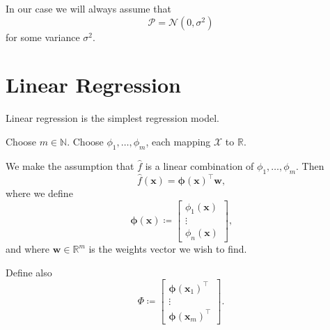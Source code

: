 \documentclass[11pt,twoside]{report}
\newcommand\bw{\mathbf{w}}
\newcommand\bx{\mathbf{x}}
\newcommand\bphi{\bm{\phi}}
\newcommand\bbN{\mathbb{N}}
\newcommand\bbR{\mathbb{R}}
\newcommand\cN{\mathcal{N}}
\newcommand\cP{\mathcal{P}}
\newcommand\cX{\mathcal{X}}
\begin{document}
In our case we will always assume that \[
    \cP = \cN(0, \sigma^2)
\] for some variance $\sigma^2$.

\section{Linear Regression}

Linear regression is the simplest regression model.

Choose $m \in \bbN$. Choose $\phi_1, \dots, \phi_m$, each mapping $\cX$ to $\bbR$.

We make the assumption that $\hat f$ is a linear combination of $\phi_1, \dots, \phi_m$. Then \[
    \hat f(\bx) = \bphi(\bx)^\top \bw \text{,}
\] where we define \[
    \bphi(\bx) \coloneqq \begin{bmatrix} \phi_1(\bx) \\ \vdots \\ \phi_n(\bx) \end{bmatrix}\text{,}
\] and where $\bw \in \bbR^m$ is the weights vector we wish to find.

Define also\[
    \Phi \coloneqq \begin{bmatrix}
        \bphi(\bx_1)^\top \\
        \vdots \\
        \bphi(\bx_m)^\top
    \end{bmatrix} \text{.}
\]
\end{document}
